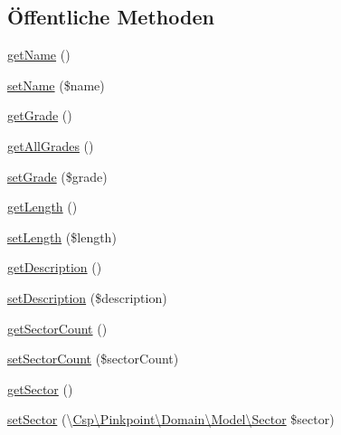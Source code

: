 \subsection*{Öffentliche Methoden}
\begin{DoxyCompactItemize}
\item 
\hyperlink{classCsp_1_1Pinkpoint_1_1Domain_1_1Model_1_1Route_a842ccec709dd6ae08cf5a8c31d8f41cb}{get\+Name} ()
\item 
\hyperlink{classCsp_1_1Pinkpoint_1_1Domain_1_1Model_1_1Route_a7dd3a202ad2928d6608eb5bae2f4d160}{set\+Name} (\$name)
\item 
\hyperlink{classCsp_1_1Pinkpoint_1_1Domain_1_1Model_1_1Route_a9d54c15f15183b99ecbe60914768bca6}{get\+Grade} ()
\item 
\hyperlink{classCsp_1_1Pinkpoint_1_1Domain_1_1Model_1_1Route_ab4969e88521458cb4d57131f137f9e1d}{get\+All\+Grades} ()
\item 
\hyperlink{classCsp_1_1Pinkpoint_1_1Domain_1_1Model_1_1Route_aa066f9311a0100fa19e47e8ab8aa0b75}{set\+Grade} (\$grade)
\item 
\hyperlink{classCsp_1_1Pinkpoint_1_1Domain_1_1Model_1_1Route_a4984510eedb5ecf897c1fdf3c5a42048}{get\+Length} ()
\item 
\hyperlink{classCsp_1_1Pinkpoint_1_1Domain_1_1Model_1_1Route_a4d790ef70ceccf784d9c2880c3601765}{set\+Length} (\$length)
\item 
\hyperlink{classCsp_1_1Pinkpoint_1_1Domain_1_1Model_1_1Route_a6b172d99a9df0e8c3dfb20478a7db66b}{get\+Description} ()
\item 
\hyperlink{classCsp_1_1Pinkpoint_1_1Domain_1_1Model_1_1Route_a9e3d11bc75920ed92278ff171df1618a}{set\+Description} (\$description)
\item 
\hyperlink{classCsp_1_1Pinkpoint_1_1Domain_1_1Model_1_1Route_a49f993dde1a86d32c24c9897ff008478}{get\+Sector\+Count} ()
\item 
\hyperlink{classCsp_1_1Pinkpoint_1_1Domain_1_1Model_1_1Route_a5b9d0508e544a9535851a6d3cd40f9f7}{set\+Sector\+Count} (\$sector\+Count)
\item 
\hyperlink{classCsp_1_1Pinkpoint_1_1Domain_1_1Model_1_1Route_a2215e03f58088c369956fb7a0c646f90}{get\+Sector} ()
\item 
\hyperlink{classCsp_1_1Pinkpoint_1_1Domain_1_1Model_1_1Route_ab399c6c232f24303cebd65c5566b0ee0}{set\+Sector} (\textbackslash{}\hyperlink{classCsp_1_1Pinkpoint_1_1Domain_1_1Model_1_1Sector}{Csp\textbackslash{}\+Pinkpoint\textbackslash{}\+Domain\textbackslash{}\+Model\textbackslash{}\+Sector} \$sector)
\item 

\end{DoxyCompactItemize}

